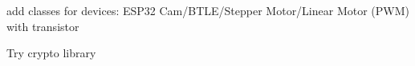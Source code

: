 
\begin{DoxyRefList}
\item[page \mbox{\hyperlink{index}{Ardu\+Forge\+: A library of classes to use with Arduino compatible microcontrollers (Uno/\+Nano/\+E\+S\+P32/...)}} ]\label{todo__todo000001}%
%
add classes for devices\+: E\+S\+P32 Cam/\+B\+T\+L\+E/\+Stepper Motor/\+Linear Motor (P\+WM) with transistor 

\label{todo__todo000002}%
%
Try crypto library
\end{DoxyRefList}
